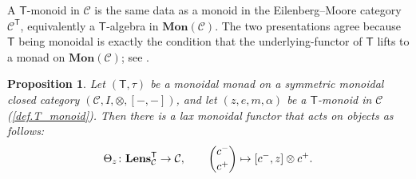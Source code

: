 \documentclass[11pt, oneside, article]{memoir}
\theoremstyle{definition}
\theoremstyle{plain}
\newtheorem{proposition}[proposition]{Proposition}
\newenvironment{remark}
  {\pushQED{\qed}\renewcommand{\qedsymbol}{$\lozenge$}\remarkx}
  {\popQED\endremarkx}
\DeclarePairedDelimiter{\ihom}{[}{]}
\newcommand{\cat}[1]{\mathcal{#1}}%
\newcommand{\Cat}[1]{\mathbf{#1}}%
\newcommand{\Fun}[1]{\mathsf{#1}}%
\newcommand{\Lens}[1]{\Cat{Lens}_{#1}}
\newcommand{\inpt}[1]{#1^{-}}
\newcommand{\outp}[1]{#1^{+}}
\newcommand{\lensob}[1]{\binom{\inpt{#1}}{\outp{#1}}}%
\begin{document}
\begin{remark}\label{rmk.T_monoid_EM}
A $\Fun{T}$-monoid in $\cat{C}$ is the same data as a monoid in the Eilenberg--Moore category $\cat{C}^{\Fun{T}}$, equivalently a $\Fun{T}$-algebra in $\Cat{Mon}(\cat{C})$. The two presentations agree because $\Fun{T}$ being monoidal is exactly the condition that the underlying-functor of $\Fun{T}$ lifts to a monad on $\Cat{Mon}(\cat{C})$; see \cite{kock1972strong}.
\end{remark}

\begin{proposition}\label{prop.Theta_T_alpha}
Let $(\Fun{T},\tau)$ be a monoidal monad on a symmetric monoidal closed category $(\cat{C},I,\otimes, [-,-])$, and let $(z,e,m,\alpha)$ be a $\Fun{T}$-monoid in $\cat{C}$ (\cref{def.T_monoid}). Then there is a lax monoidal functor that acts on objects as follows:
\[
\Theta_z\colon\Lens{\cat{C}}^\Fun{T}\to\cat{C},\qquad
\lensob{c}\mapsto\ihom{\inpt c,z}\otimes\outp c.
\]
\end{proposition}
\end{document}
